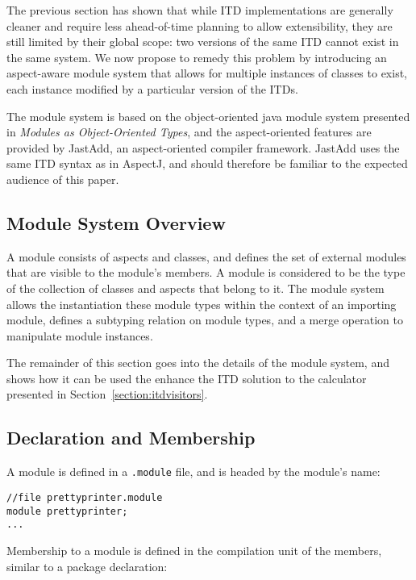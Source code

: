 The previous section has shown that while ITD implementations are generally
cleaner and require less ahead-of-time planning to allow extensibility, they
are still limited by their global scope: two versions of the same ITD cannot
exist in the same system. We now propose to remedy this problem by introducing
an aspect-aware module system that allows for multiple instances of classes
to exist, each instance modified by a particular version of the ITDs.

The module system is based on the object-oriented java module system 
presented in \textit{Modules as Object-Oriented Types}\cite{modulesastypes},
and the aspect-oriented features are provided by Jast\-Add\cite{jastadd, jastaddjavacompiler}, 
an aspect-oriented compiler framework. Jast\-Add uses the same ITD 
syntax as in AspectJ, and should therefore be familiar to the expected audience
of this paper.

\subsection{Module System Overview}

A module consists of aspects and classes, and defines the set of external
modules that are visible to the module's members. 
A module is considered to be the type of the collection of classes and aspects
that belong to it. The module system allows the instantiation these module types
within the context of an importing module, defines a subtyping relation
on module types, and a merge operation to manipulate module instances.

The remainder of this section goes into the details of the module system, and shows
how it can be used the enhance the ITD solution to the calculator 
presented in Section~\ref{section:itdvisitors}.

\subsection{Declaration and Membership}

A module is defined in a \texttt{.module} file, and is headed by the module's name:

\begin{lstlisting}[caption={Module Declaration}]
//file prettyprinter.module
module prettyprinter;
...
\end{lstlisting}

Membership to a module is defined in the compilation unit of the members,
similar to a package declaration:

